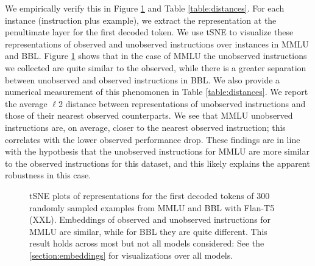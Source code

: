 We empirically verify this in Figure \ref{fig:embeddings} and Table \ref{table:distances}. For each instance (instruction plus example), we extract the representation at the penultimate layer for the first decoded token. %
We use tSNE \cite{van2008visualizing} to visualize these representations of observed and unobserved instructions over instances in \textsc{MMLU} and \textsc{BBL}.
Figure \ref{fig:embeddings} shows that in the case of \textsc{MMLU} the unobserved instructions we collected are quite similar to the observed, while there is a greater separation between unobserved and observed instructions in \textsc{BBL}.
We also provide a numerical measurement of this phenomonen in Table \ref{table:distances}.
We report the average $\ell$2 distance between representations of unobserved instructions and those of their nearest observed counterparts.
We see that \textsc{MMLU} unobserved instructions are, on average, closer to the nearest observed instruction; this correlates with the lower observed performance drop.
These findings are in line with the hypothesis that the unobserved instructions for \textsc{MMLU} are more similar to the observed instructions for this dataset, and this likely explains the apparent robustness in this case. %


\begin{figure}[h]
  \centering
  \caption{tSNE plots of representations for the first decoded tokens of 300 randomly sampled examples from \textsc{MMLU} and \textsc{BBL} with Flan-T5 (XXL). Embeddings of observed and unobserved instructions for \textsc{MMLU} are similar, while for \textsc{BBL} they are quite different. This result holds across most but not all models considered: See the \ref{section:embeddings} for visualizations over all models.}%
  \label{fig:embeddings}
\end{figure}


